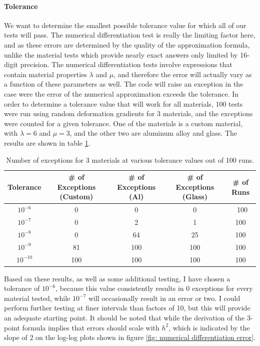 \documentclass[]{spie}  %
\newcommand\Tstrut{\rule{0pt}{2.6ex}}         %
\begin{document}
\paragraph{Tolerance}
We want to determine the smallest possible tolerance value for which all of our tests will pass. The numerical differentiation test is really the limiting factor here, and as these errors are determined by the quality of the approximation formula, unlike the material tests which provide nearly exact answers only limited by 16-digit precision. The numerical differentiation tests involve expressions that contain material properties $\lambda$ and $\mu$, and therefore the error will actually vary as a function of these parameters as well. The code will raise an exception in the case were the error of the numerical approximation exceeds the tolerance. In order to determine a tolerance value that will work for all materials, 100 tests were run using random deformation gradients for 3 materials, and the exceptions were counted for a given tolerance. One of the materials is a custom material, with $\lambda = 6$ and $\mu = 3$, and the other two are aluminum alloy and glass. The results are shown in table \ref{table: tolerance}. 

\begin{table}[h]
	\centering
	\caption{Number of exceptions for 3 materials at various tolerance values out of 100 runs.}
	\begin{tabular}{ | c | c | c | c | c |}
		\hline
		Tolerance  & \# of Exceptions (Custom) & \# of Exceptions (Al) & \# of Exceptions (Glass) & \# of Runs \Tstrut \\ \hline
		$10^{-6}$  & 0   & 0   & 0   & \ 100 \Tstrut \\
		$10^{-7}$  & 0   & 2   & 1   & 100 \\
		$10^{-8}$  & 0   & 64  & 25  & 100 \\
		$10^{-9}$  & 81  & 100 & 100 & 100 \\
		$10^{-10}$ & 100 & 100 & 100 & 100 \\
		\hline
	\end{tabular}
	\label{table: tolerance}
\end{table}

Based on these results, as well as some additional testing, I have chosen a tolerance of $10^{-6}$, because this value consistently results in 0 exceptions for every material tested, while $10^{-7}$ will occasionally result in an error or two. I could perform further testing at finer intervals than factors of 10, but this will provide an adequate starting point. It should be noted that while the derivation of the 3-point formula implies that errors should scale with $h^2$, which is indicated by the slope of 2 on the log-log plots shown in figure \ref{fig: numerical differentiation error}. 
\end{document}
